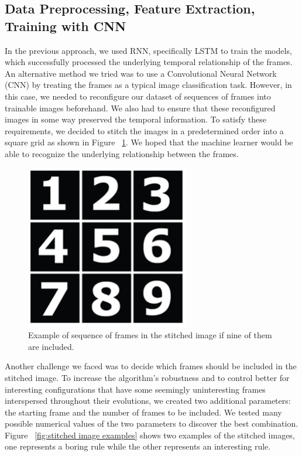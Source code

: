 \documentclass[12pt]{article}
\numberwithin{figure}{section} %
\begin{document}
\subsection{Data Preprocessing, Feature Extraction, Training with CNN}
\label{CNN Training}
In the previous approach, we used RNN, specifically LSTM to train the models, which successfully processed the underlying temporal relationship of the frames. An alternative method we tried was to use a Convolutional Neural Network (CNN) by treating the frames as a typical image classification task. However, in this case, we needed to reconfigure our dataset of sequences of frames into trainable images beforehand. We also had to ensure that these reconfigured images in some way preserved the temporal information. To satisfy these requirements, we decided to stitch the images in a predetermined order into a square grid as shown in Figure ~\ref{fig:stitched square grid}. We hoped that the machine learner would be able to recognize the underlying relationship between the frames. 

\begin{figure}[H]
	\centering
	\includegraphics[width=0.3\linewidth]{Section3/2}
	\caption[Stitched square grid]{Example of sequence of frames in the stitched image if nine of them are included.}
	\vspace{-1.5em}
	\label{fig:stitched square grid}
\end{figure}
Another challenge we faced was to decide which frames should be included in the stitched image. To increase the algorithm’s robustness and to control better for interesting configurations that have some seemingly uninteresting frames interspersed throughout their evolutions, we created two additional parameters: the starting frame and the number of frames to be included. We tested many possible numerical values of the two parameters to discover the best combination. Figure ~\ref{fig:stitched image examples} shows two examples of the stitched images, one represents a boring rule while the other represents an interesting rule. 
\end{document}
